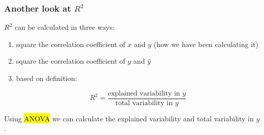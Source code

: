 \begin{frame}[fragile]
\frametitle{Another look at $R^2$}

$R^2$ can be calculated in three ways:

\pause

\begin{enumerate}

\item square the correlation coefficient of $x$ and $y$ {\small (how we have been calculating it)}

\pause

\item square the correlation coefficient of $y$ and $\hat{y}$

\pause

\item based on definition: 

\[ R^2 = \frac{\text{explained variability in }y}{\text{total variability in }y} \]

\end{enumerate}

\pause

Using \hl{ANOVA} we can calculate the explained variability and total variability in $y$.

\end{frame}




